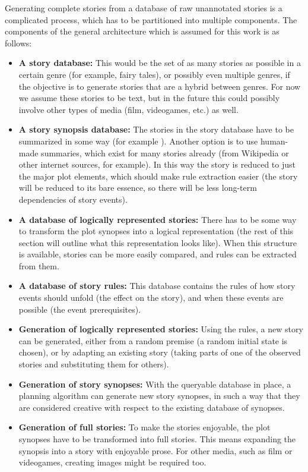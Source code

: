 Generating complete stories from a database of raw unannotated stories is a
complicated process, which has to be partitioned into multiple components.
The components of the general architecture which is assumed for this work is as follows:
\begin{itemize}
\item \textbf{A story database:} This would be the set of as many stories
as possible in a certain genre (for example, fairy tales), or possibly even
multiple genres, if the objective is to generate stories that are a hybrid
between genres. For now we assume these stories to be text, but in the future
this could possibly involve other types of media (film, videogames, etc.) as
well.
\item \textbf{A story synopsis database:} The stories in the story database have 
to be summarized in some way (for example \cite{salton1997automatic}). Another
option is to use human-made summaries, which exist for many stories already
(from Wikipedia or other internet sources, for example). In this way the story
is reduced to just the major plot elements, which should make rule extraction
easier (the story will be reduced to its bare essence, so there will be less 
long-term dependencies of story events).
\item \textbf{A database of logically represented stories:} There has to be some
way to transform the plot synopses into a logical representation (the rest of
this section will outline what this representation looks like). When this
structure is available, stories can be more easily compared, and rules can be
extracted from them.
\item \textbf{A database of story rules:} This database contains the rules of
how story events should unfold (the effect on the story), and when these events
are possible (the event prerequisites).
\item \textbf{Generation of logically represented stories:} Using the rules, a
new story can be generated, either from a random premise (a random initial state
is chosen), or by adapting an existing story (taking parts of one of the
observed stories and substituting them for others).
\item \textbf{Generation of story synopses:} With the queryable database in place, a
planning algorithm can generate new story synopses, in such a way that they are
considered creative with respect to the existing database of synopses.
\item \textbf{Generation of full stories:} To make the stories enjoyable, the
plot synopses have to be transformed into full stories. This means expanding the
synopsis into a story with enjoyable prose. For other media, such as film or
videogames, creating images might be required too.
\end{itemize}
